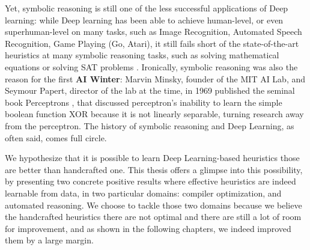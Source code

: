 Yet, symbolic reasoning is still one of the less successful applications of Deep learning: while Deep learning has been able to achieve human-level, or even superhuman-level on many tasks, such as Image Recognition, Automated Speech Recognition, Game Playing (Go, Atari), it still fails short of the state-of-the-art heuristics at many symbolic reasoning tasks, such as solving mathematical equations \cite{lample2019deep} or solving SAT problems \cite{neuralsat}. Ironically, symbolic reasoning was also the reason for the first \textbf{AI Winter}: Marvin Minsky, founder of the MIT AI Lab, and Seymour Papert, director of the lab at the time, in 1969 published the seminal book Perceptrons \cite{perceptrons}, that discussed perceptron's inability to learn the simple boolean function XOR because it is not linearly separable, turning research away from the perceptron. The history of symbolic reasoning and Deep Learning, as often said, comes full circle.

We hypothesize that it is possible to learn Deep Learning-based heuristics those are better than handcrafted one. This thesis offers a glimpse into this possibility, by presenting two concrete positive results where effective heuristics are indeed learnable from data, in two particular domains: compiler optimization, and automated reasoning. We choose to tackle those two domains because we believe the handcrafted heuristics there are not optimal and there are still a lot of room for improvement, and as shown in the following chapters, we indeed improved them by a large margin.




